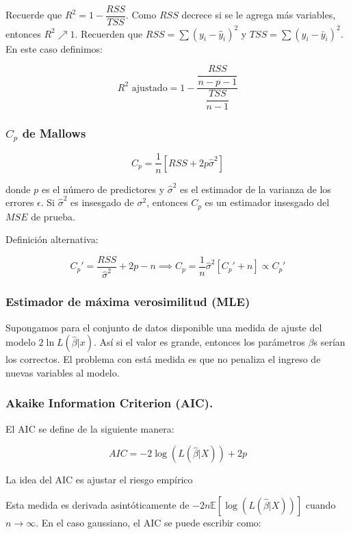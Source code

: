 \documentclass[
  12pt,
]{book}
\theoremstyle{definition}
\theoremstyle{definition}
\theoremstyle{definition}
\theoremstyle{definition}
\theoremstyle{remark}
\begin{document}
Recuerde que \(R^2 = 1 - \dfrac{RSS}{TSS}\). Como \(RSS\) decrece si se le agrega más variables, entonces \(R^2 \nearrow 1\). Recuerden que \(RSS = \sum(y_i-\hat{y}_i)^2\) y \(TSS = \sum(y_i-\bar{y}_i)^2\). En este caso definimos:

\[R^2 \text{ ajustado}= 1-\dfrac{\dfrac{RSS}{n-p-1}}{\dfrac{TSS}{n-1}}\]

\hypertarget{c_p-de-mallows}{%
\subsubsection{\texorpdfstring{\(C_p\) de Mallows}{C\_p de Mallows}}\label{c_p-de-mallows}}

\[ C_p = \dfrac{1}{n}\left[RSS+2p\hat\sigma^2\right]\]

donde \(p\) es el número de predictores y \(\hat\sigma^2\) es el estimador de la varianza de los errores \(\epsilon\). Si \(\hat\sigma^2\) es insesgado de \(\sigma^2\), entonces \(C_p\) es un estimador insesgado del \(MSE\) de prueba.

Definición alternativa:

\[ C_p' = \dfrac{RSS}{\hat\sigma^2} + 2p-n \implies C_p = \dfrac1n\hat\sigma^2[C_p'+n] \propto C_p'\]

\hypertarget{estimador-de-muxe1xima-verosimilitud-mle}{%
\subsubsection{Estimador de máxima verosimilitud (MLE)}\label{estimador-de-muxe1xima-verosimilitud-mle}}

Supongamos para el conjunto de datos disponible una medida de ajuste del modelo \(2\ln L(\hat{\beta} | x)\). Así si el valor es grande, entonces los parámetros \(\beta\)s serían los correctos. El problema con está medida es que no penaliza el ingreso de nuevas variables al modelo.

\hypertarget{akaike-information-criterion-aic.}{%
\subsubsection{Akaike Information Criterion (AIC).}\label{akaike-information-criterion-aic.}}

El AIC se define de la siguiente manera:

\[
AIC = -2\log(L(\hat{\beta} \vert X)) + 2p 
\]

La idea del AIC es ajustar el riesgo empírico

Esta medida es derivada asintóticamente de \(-2n\mathbb{E}[\log(L(\hat{\beta} \vert X))]\) cuando \(n\to \infty\). En el caso gaussiano, el AIC se puede escribir como:
\end{document}
